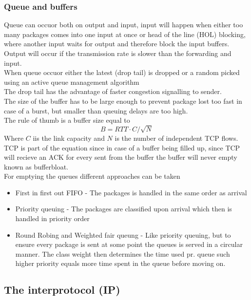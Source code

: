 \documentclass[12pt, a4paper]{article}
\begin{document}
			\subsubsection{Queue and buffers}
				Queue can occuor both on output and input, input will happen when either too many packages comes into one input at once or head of the line (HOL) blocking, where another input waits for output and therefore block the input buffers.\\
				Output will occur if the transmission rate is slower than the forwarding and input.\\
				When queue occuor either the latest (drop tail) is dropped or a random picked using an active queue management algorithm\\
				The drop tail has the advantage of faster congestion signalling to sender.\\
				The size of the buffer has to be large enough to prevent package lost too fast in case of a burst, but smaller than queuing delays are too high.\\
				The rule of thumb is a buffer size equal to 
				$$B=RTT\cdot C/\sqrt{N}$$
				Where $C$ iis the link capacity and $N$ is the number of independent TCP flows.\\
				TCP is part of the equation since in case of a buffer being filled up, since TCP will recieve an ACK for every sent from the buffer the buffer will never empty known as bufferbloat.\\
				For emptying the queues different approaches can be taken
				\begin{itemize}
					\item First in first out FIFO - The packages is handled in the same order as arrival
					\item Priority queuing - The packages are classified upon arrival which then is handled in priority order
					\item Round Robing and Weighted fair queung - Like priority queuing, but to ensure every package is sent at some point the queues is served in a circular manner. The class weight then determines the time used pr. queue such higher priority equals more time spent in the queue before moving on.
				\end{itemize}
		\subsection{The interprotocol (IP)}
\end{document}
